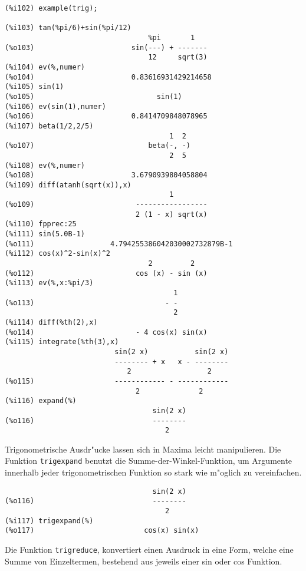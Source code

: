\documentclass[ngerman,12pt,a4paper]{article}
\begin{document}
\scriptsize
\begin{verbatim}
(%i102) example(trig);

(%i103) tan(%pi/6)+sin(%pi/12)
                                  %pi       1
(%o103)                       sin(---) + -------
                                  12     sqrt(3)
(%i104) ev(%,numer)
(%o104)                       0.83616931429214658
(%i105) sin(1)
(%o105)                             sin(1)
(%i106) ev(sin(1),numer)
(%o106)                       0.8414709848078965
(%i107) beta(1/2,2/5)
                                       1  2
(%o107)                           beta(-, -)
                                       2  5
(%i108) ev(%,numer)
(%o108)                       3.6790939804058804
(%i109) diff(atanh(sqrt(x)),x)
                                       1
(%o109)                        -----------------
                               2 (1 - x) sqrt(x)
(%i110) fpprec:25
(%i111) sin(5.0B-1)
(%o111)                  4.794255386042030002732879B-1
(%i112) cos(x)^2-sin(x)^2
                                  2         2
(%o112)                        cos (x) - sin (x)
(%i113) ev(%,x:%pi/3)
                                        1
(%o113)                               - -
                                        2
(%i114) diff(%th(2),x)
(%o114)                        - 4 cos(x) sin(x)
(%i115) integrate(%th(3),x)
                          sin(2 x)           sin(2 x)
                          -------- + x   x - --------
                             2                  2
(%o115)                   ------------ - ------------
                               2              2
(%i116) expand(%)
                                   sin(2 x)
(%o116)                            --------
                                      2
\end{verbatim}
\normalsize

Trigonometrische Ausdr"ucke lassen sich in Maxima leicht manipulieren. Die Funktion \verb|trigexpand| benutzt die Summe-der-Winkel-Funktion, um Argumente innerhalb jeder trigonometrischen Funktion so stark wie m"oglich zu vereinfachen.

\scriptsize
\begin{verbatim}
                                   sin(2 x)
(%o116)                            --------
                                      2
(%i117) trigexpand(%)
(%o117)                          cos(x) sin(x)
\end{verbatim}
\normalsize

Die Funktion \verb|trigreduce|, konvertiert einen Ausdruck in eine Form, welche eine Summe von Einzeltermen, bestehend aus jeweils einer sin oder cos Funktion.
\end{document}
